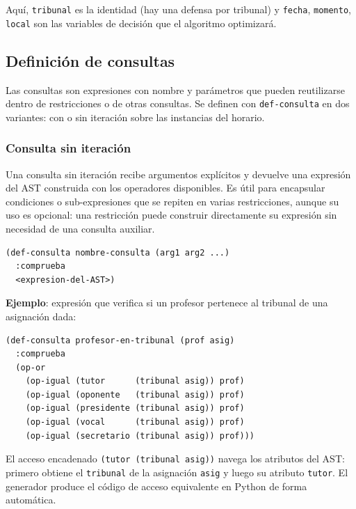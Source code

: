 \documentclass[12pt,a4paper]{article}
\newcommand{\code}[1]{\texttt{#1}}
\begin{document}
Aquí, \code{tribunal} es la identidad (hay una defensa por tribunal) y
\code{fecha}, \code{momento}, \code{local} son las variables de decisión
que el algoritmo optimizará.

\subsection{Definición de consultas}
\label{sec:consultas}

Las consultas son expresiones con nombre y parámetros que pueden
reutilizarse dentro de restricciones o de otras consultas.
Se definen con \code{def-consulta} en dos variantes: con o sin
iteración sobre las instancias del horario.

\subsubsection{Consulta sin iteración}

Una consulta sin iteración recibe argumentos explícitos y devuelve
una expresión del AST construida con los operadores disponibles.
Es útil para encapsular condiciones o sub-expresiones que se repiten
en varias restricciones, aunque su uso es opcional: una restricción
puede construir directamente su expresión sin necesidad de una consulta
auxiliar.

\begin{lstlisting}[style=lisp, caption={Sintaxis de consulta sin iteración}]
(def-consulta nombre-consulta (arg1 arg2 ...)
  :comprueba
  <expresion-del-AST>)
\end{lstlisting}

\textbf{Ejemplo}: expresión que verifica si un profesor pertenece al
tribunal de una asignación dada:

\begin{lstlisting}[style=lisp, caption={Consulta auxiliar: profesor en tribunal}]
(def-consulta profesor-en-tribunal (prof asig)
  :comprueba
  (op-or
    (op-igual (tutor      (tribunal asig)) prof)
    (op-igual (oponente   (tribunal asig)) prof)
    (op-igual (presidente (tribunal asig)) prof)
    (op-igual (vocal      (tribunal asig)) prof)
    (op-igual (secretario (tribunal asig)) prof)))
\end{lstlisting}

El acceso encadenado \code{(tutor (tribunal asig))} navega los atributos
del AST: primero obtiene el \code{tribunal} de la asignación \code{asig}
y luego su atributo \code{tutor}. El generador produce el código de
acceso equivalente en Python de forma automática.
\end{document}
